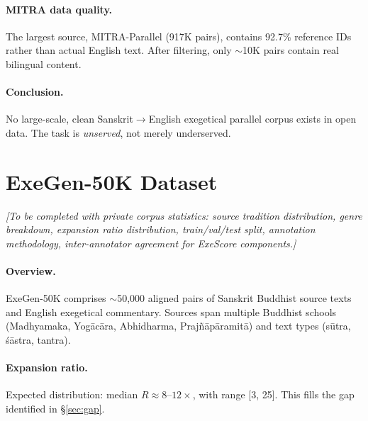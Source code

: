 \documentclass[11pt]{article}
\begin{document}
\paragraph{MITRA data quality.}
The largest source, MITRA-Parallel (917K pairs), contains 92.7\% reference IDs rather than actual English text. After filtering, only $\sim$10K pairs contain real bilingual content.

\paragraph{Conclusion.}
No large-scale, clean Sanskrit$\rightarrow$English exegetical parallel corpus exists in open data. The task is \textit{unserved}, not merely underserved.



\section{ExeGen-50K Dataset}
\label{sec:dataset}

\textit{[To be completed with private corpus statistics: source tradition distribution, genre breakdown, expansion ratio distribution, train/val/test split, annotation methodology, inter-annotator agreement for ExeScore components.]}

\paragraph{Overview.}
ExeGen-50K comprises $\sim$50,000 aligned pairs of Sanskrit Buddhist source texts and English exegetical commentary. Sources span multiple Buddhist schools (Madhyamaka, Yog\=ac\=ara, Abhidharma, Praj\~n\=ap\=aramit\=a) and text types (s\=utra, \'s\=astra, tantra).

\paragraph{Expansion ratio.}
Expected distribution: median $R \approx 8\text{--}12\times$, with range [3, 25]. This fills the gap identified in \S\ref{sec:gap}.
\end{document}
